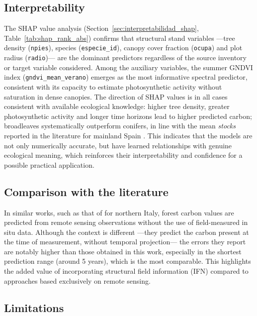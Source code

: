\subsection*{Interpretability}

The SHAP value analysis (Section~\ref{sec:interpretabilidad_shap}, Table~\ref{tab:shap_rank_abs}) confirms that structural stand variables ---tree density (\texttt{npies}), species (\texttt{especie_id}), canopy cover fraction (\texttt{ocupa}) and plot radius (\texttt{radio})--- are the dominant predictors regardless of the source inventory or target variable considered. Among the auxiliary variables, the summer GNDVI index (\texttt{gndvi_mean_verano}) emerges as the most informative spectral predictor, consistent with its capacity to estimate photosynthetic activity without saturation in dense canopies. The direction of SHAP values is in all cases consistent with available ecological knowledge: higher tree density, greater photosynthetic activity and longer time horizons lead to higher predicted carbon; broadleaves systematically outperform conifers, in line with the mean \textit{stocks} reported in the literature for mainland Spain \citep{vayreda2012carbon}. This indicates that the models are not only numerically accurate, but have learned relationships with genuine ecological meaning, which reinforces their interpretability and confidence for a possible practical application.

\subsection*{Comparison with the literature}

In similar works, such as that of \citet{fasihi2024assessing} for northern Italy, forest carbon values are predicted from remote sensing observations without the use of field-measured in situ data. Although the context is different ---they predict the carbon present at the time of measurement, without temporal projection--- the errors they report are notably higher than those obtained in this work, especially in the shortest prediction range (around 5 years), which is the most comparable. This highlights the added value of incorporating structural field information (IFN) compared to approaches based exclusively on remote sensing.

\subsection*{Limitations}


